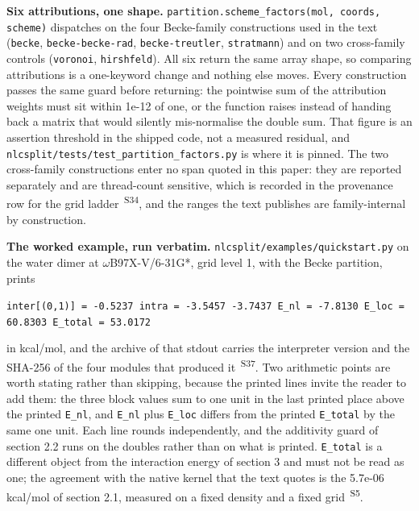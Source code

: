 \documentclass[11pt]{article}
\newcommand{\prov}[1]{\textsuperscript{\,#1}}
\begin{document}
\textbf{Six attributions, one shape.} \texttt{partition.scheme\_\allowbreak{}factors(mol, coords, scheme)} dispatches on the four Becke-family constructions used in the text (\texttt{becke}, \texttt{becke-becke-rad}, \texttt{becke-treutler}, \texttt{stratmann}) and on two cross-family controls (\texttt{voronoi}, \texttt{hirshfeld}). All six return the same array shape, so comparing attributions is a one-keyword change and nothing else moves. Every construction passes the same guard before returning: the pointwise sum of the attribution weights must sit within 1e-12 of one, or the function raises instead of handing back a matrix that would silently mis-normalise the double sum. That figure is an assertion threshold in the shipped code, not a measured residual, and \texttt{nlcsplit/\allowbreak{}tests/\allowbreak{}test\_\allowbreak{}partition\_\allowbreak{}factors.py} is where it is pinned. The two cross-family constructions enter no span quoted in this paper: they are reported separately and are thread-count sensitive, which is recorded in the provenance row for the grid ladder \prov{S34}, and the ranges the text publishes are family-internal by construction.

\textbf{The worked example, run verbatim.} \texttt{nlcsplit/\allowbreak{}examples/\allowbreak{}quickstart.py} on the water dimer at $\omega$B97X-V/6-31G*, grid level 1, with the Becke partition, prints

\texttt{inter[(0,1)] = -0.5237   intra = -3.5457 -3.7437   E\_\allowbreak{}nl = -7.8130   E\_\allowbreak{}loc = 60.8303   E\_\allowbreak{}total = 53.0172}

in kcal/mol, and the archive of that stdout carries the interpreter version and the SHA-256 of the four modules that produced it \prov{S37}. Two arithmetic points are worth stating rather than skipping, because the printed lines invite the reader to add them: the three block values sum to one unit in the last printed place above the printed \texttt{E\_nl}, and \texttt{E\_nl} plus \texttt{E\_loc} differs from the printed \texttt{E\_total} by the same one unit. Each line rounds independently, and the additivity guard of section 2.2 runs on the doubles rather than on what is printed. \texttt{E\_total} is a different object from the interaction energy of section 3 and must not be read as one; the agreement with the native kernel that the text quotes is the 5.7e-06 kcal/mol of section 2.1, measured on a fixed density and a fixed grid \prov{S5}.
\end{document}
